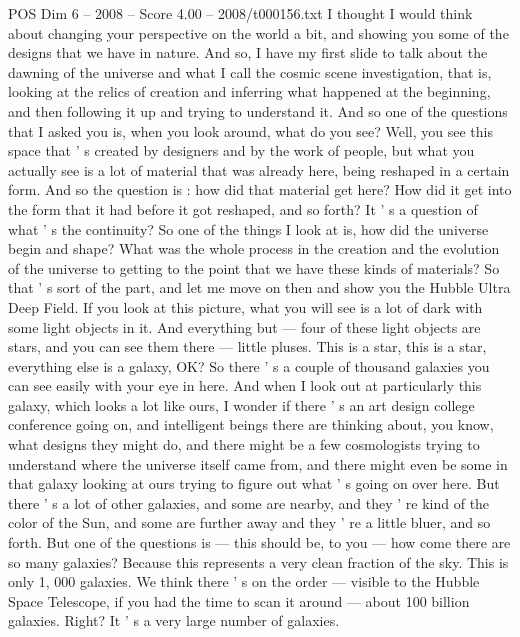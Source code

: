 \begin{textsample}{POS Dim 6 – 2008 – Score 4.00 – 2008/t000156.txt}  \label{ex:f6_pos_011}
I thought I would think about changing your perspective on the world a bit, and showing you some of the designs that we have in nature.
And so, I have my first slide to talk about the dawning of the universe and what I call the cosmic scene investigation, that is, looking at the relics of creation and inferring what happened at the beginning, and then following it up and trying to understand it.
And so one of the questions that I asked you is, when you look around, what do you see?
Well, you see this space that ' s created by designers and by the work of people, but what you actually see is a lot of material that was already here, being reshaped in a certain form.
And so the question is : how did that material get here?
How did it get into the form that it had before it got reshaped, and so forth?
It ' s a question of what ' s the continuity?
So one of the things I look at is, how did the universe begin and shape?
What was the whole process in the creation and the evolution of the universe to getting to the point that we have these kinds of materials?
So that ' s sort of the part, and let me move on then and show you the Hubble Ultra Deep Field.
If you look at this picture, what you will see is a lot of dark with some light objects in it.
And everything but — four of these light objects are stars, and you can see them there — little pluses.
This is a star, this is a star, everything else is a galaxy, OK?
So there ' s a couple of thousand galaxies you can see easily with your eye in here.
And when I look out at particularly this galaxy, which looks a lot like ours, I wonder if there ' s an art design college conference going on, and intelligent beings there are thinking about, you know, what designs they might do, and there might be a few cosmologists trying to understand where the universe itself came from, and there might even be some in that galaxy looking at ours trying to figure out what ' s going on over here.
But there ' s a lot of other galaxies, and some are nearby, and they ' re kind of the color of the Sun, and some are further away and they ' re a little bluer, and so forth.
But one of the questions is — this should be, to you — how come there are so many galaxies?
Because this represents a very clean fraction of the sky.
This is only 1, 000 galaxies.
We think there ' s on the order — visible to the Hubble Space Telescope, if you had the time to scan it around — about 100 billion galaxies.
Right?
It ' s a very large number of galaxies.

\end{textsample}
